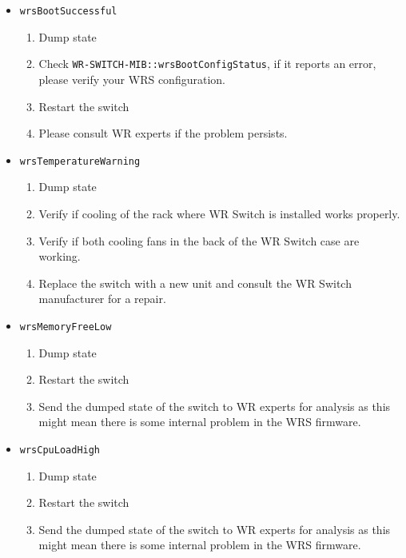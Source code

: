 \begin{itemize}
  \item \texttt{wrsBootSuccessful}
    \begin{enumerate}
      \item Dump state
      \item Check \texttt{WR-SWITCH-MIB::wrsBootConfigStatus}, if it reports an
        error, please verify your WRS configuration.
      \item Restart the switch
      \item Please consult WR experts if the problem persists.
    \end{enumerate}

  \item \texttt{wrsTemperatureWarning}
    \begin{enumerate}
      \item Dump state
      \item Verify if cooling of the rack where WR Switch is installed works
        properly.
      \item Verify if both cooling fans in the back of the WR Switch case are
        working.
      \item Replace the switch with a new unit and consult the WR Switch
        manufacturer for a repair.
    \end{enumerate}

  \item \texttt{wrsMemoryFreeLow}
    \begin{enumerate}
      \item Dump state
      \item Restart the switch
      \item Send the dumped state of the switch to WR experts for analysis as
        this might mean there is some internal problem in the WRS firmware.
    \end{enumerate}

  \item \texttt{wrsCpuLoadHigh}
    \begin{enumerate}
      \item Dump state
      \item Restart the switch
      \item Send the dumped state of the switch to WR experts for analysis as
        this might mean there is some internal problem in the WRS firmware.
    \end{enumerate}


\end{itemize}
